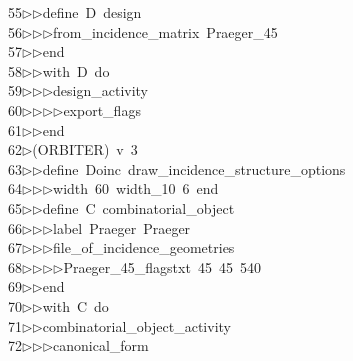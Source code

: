 \begin{tabbing}
55\>$\triangleright$\>$\triangleright$\>define\ D\ design\ \\[0pt]
56\>$\triangleright$\>$\triangleright$\>$\triangleright$\>from\_incidence\_matrix\ Praeger\_45\ \\[0pt]
57\>$\triangleright$\>$\triangleright$\>end\ \\[0pt]
58\>$\triangleright$\>$\triangleright$\>with\ D\ do\ \\[0pt]
59\>$\triangleright$\>$\triangleright$\>$\triangleright$\>design\_activity\ \\[0pt]
60\>$\triangleright$\>$\triangleright$\>$\triangleright$\>$\triangleright$\>export\_flags\ \\[0pt]
61\>$\triangleright$\>$\triangleright$\>end\\[0pt]
62\>$\triangleright$\>(ORBITER)\ v\ 3\ \\[0pt]
63\>$\triangleright$\>$\triangleright$\>define\ Doinc\ draw\_incidence\_structure\_options\ \\[0pt]
64\>$\triangleright$\>$\triangleright$\>$\triangleright$\>width\ 60\ width\_10\ 6\ end\ \\[0pt]
65\>$\triangleright$\>$\triangleright$\>define\ C\ combinatorial\_object\ \\[0pt]
66\>$\triangleright$\>$\triangleright$\>$\triangleright$\>label\ Praeger\ Praeger\ \\[0pt]
67\>$\triangleright$\>$\triangleright$\>$\triangleright$\>file\_of\_incidence\_geometries\ \\[0pt]
68\>$\triangleright$\>$\triangleright$\>$\triangleright$\>$\triangleright$\>Praeger\_45\_flagstxt\ 45\ 45\ 540\ \\[0pt]
69\>$\triangleright$\>$\triangleright$\>end\ \\[0pt]
70\>$\triangleright$\>$\triangleright$\>with\ C\ do\ \\[0pt]
71\>$\triangleright$\>$\triangleright$\>combinatorial\_object\_activity\ \\[0pt]
72\>$\triangleright$\>$\triangleright$\>$\triangleright$\>canonical\_form\ \\[0pt]

\end{tabbing}
